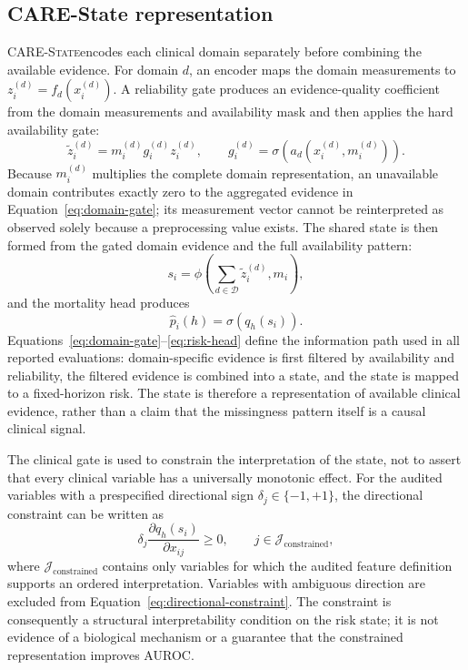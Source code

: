 \documentclass[12pt]{article}
\newcommand{\care}{\textsc{CARE-State}}
\begin{document}
\subsection{CARE-State representation}
\care encodes each clinical domain separately before combining the available evidence. For domain $d$, an encoder maps the domain measurements to $z_i^{(d)}=f_d(x_i^{(d)})$. A reliability gate produces an evidence-quality coefficient from the domain measurements and availability mask and then applies the hard availability gate:
\begin{equation}
 \tilde z_i^{(d)}=m_i^{(d)}g_i^{(d)}z_i^{(d)},\qquad
 g_i^{(d)}=\sigma\left(a_d(x_i^{(d)},m_i^{(d)})\right).
 \label{eq:domain-gate}
\end{equation}
Because $m_i^{(d)}$ multiplies the complete domain representation, an unavailable domain contributes exactly zero to the aggregated evidence in Equation~\ref{eq:domain-gate}; its measurement vector cannot be reinterpreted as observed solely because a preprocessing value exists. The shared state is then formed from the gated domain evidence and the full availability pattern:
\begin{equation}
 s_i=\phi\left(\sum_{d\in\mathcal{D}}\tilde z_i^{(d)},m_i\right),
 \label{eq:shared-state}
\end{equation}
and the mortality head produces
\begin{equation}
 \hat p_i(h)=\sigma\left(q_h(s_i)\right).
 \label{eq:risk-head}
\end{equation}
Equations~\ref{eq:domain-gate}--\ref{eq:risk-head} define the information path used in all reported evaluations: domain-specific evidence is first filtered by availability and reliability, the filtered evidence is combined into a state, and the state is mapped to a fixed-horizon risk. The state is therefore a representation of available clinical evidence, rather than a claim that the missingness pattern itself is a causal clinical signal.

The clinical gate is used to constrain the interpretation of the state, not to assert that every clinical variable has a universally monotonic effect. For the audited variables with a prespecified directional sign $\delta_j\in\{-1,+1\}$, the directional constraint can be written as
\begin{equation}
 \delta_j\frac{\partial q_h(s_i)}{\partial x_{ij}}\geq 0,
 \qquad j\in\mathcal{J}_{\mathrm{constrained}},
 \label{eq:directional-constraint}
\end{equation}
where $\mathcal{J}_{\mathrm{constrained}}$ contains only variables for which the audited feature definition supports an ordered interpretation. Variables with ambiguous direction are excluded from Equation~\ref{eq:directional-constraint}. The constraint is consequently a structural interpretability condition on the risk state; it is not evidence of a biological mechanism or a guarantee that the constrained representation improves AUROC.
\end{document}
